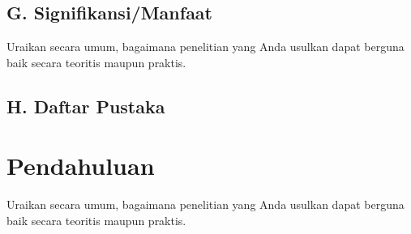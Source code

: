 \documentclass[../riset_senja.tex]{subfiles}
\begin{document}
\subsection{G. Signifikansi/Manfaat}
Uraikan secara umum, bagaimana penelitian yang Anda usulkan dapat berguna baik secara teoritis maupun praktis.

\subsection{H. Daftar Pustaka}


\section{Pendahuluan}%
\label{sec:Pendahuluan}


Uraikan secara umum, bagaimana penelitian yang Anda usulkan dapat berguna baik secara teoritis maupun praktis.







\end{document}
